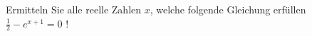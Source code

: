 \item
Ermitteln Sie alle reelle Zahlen $x$, welche folgende Gleichung erfüllen $\frac{1}{2}-e^{x+1}=0$ !
